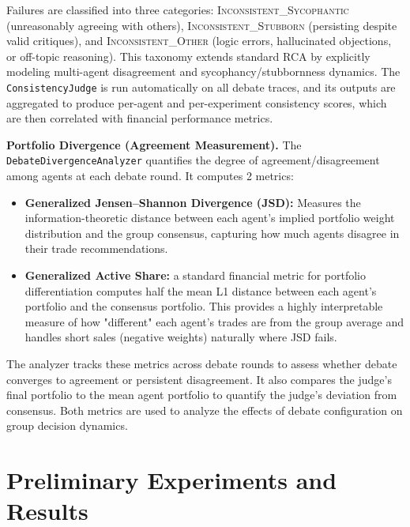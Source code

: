 \documentclass{article}
\begin{document}
Failures are classified into three categories: \textsc{Inconsistent\_Sycophantic} (unreasonably agreeing with others), \textsc{Inconsistent\_Stubborn} (persisting despite valid critiques), and \textsc{Inconsistent\_Other} (logic errors, hallucinated objections, or off-topic reasoning). This taxonomy extends standard RCA by explicitly modeling multi-agent disagreement and sycophancy/stubbornness dynamics. The \texttt{ConsistencyJudge} is run automatically on all debate traces, and its outputs are aggregated to produce per-agent and per-experiment consistency scores, which are then correlated with financial performance metrics.

	\textbf{Portfolio Divergence (Agreement Measurement).}
The \texttt{DebateDivergenceAnalyzer} quantifies the degree of agreement/disagreement among agents at each debate round. It computes 2 metrics:
\begin{itemize}
  \item \textbf{Generalized Jensen--Shannon Divergence (JSD):} Measures the information-theoretic distance between each agent's implied portfolio weight distribution and the group consensus, capturing how much agents disagree in their trade recommendations.
  \item \textbf{Generalized Active Share:} a standard financial metric for portfolio differentiation computes half the mean L1 distance between each agent's portfolio and the consensus portfolio. This provides a highly interpretable measure of how "different" each agent's trades are from the group average and handles short sales (negative weights) naturally where JSD fails.
\end{itemize}
The analyzer tracks these metrics across debate rounds to assess whether debate converges to agreement or persistent disagreement. It also compares the judge's final portfolio to the mean agent portfolio to quantify the judge's deviation from consensus. Both metrics are used to analyze the effects of debate configuration on group decision dynamics.


\vspace{-6pt}
\section{Preliminary Experiments and Results}
\vspace{-6pt}
\end{document}
